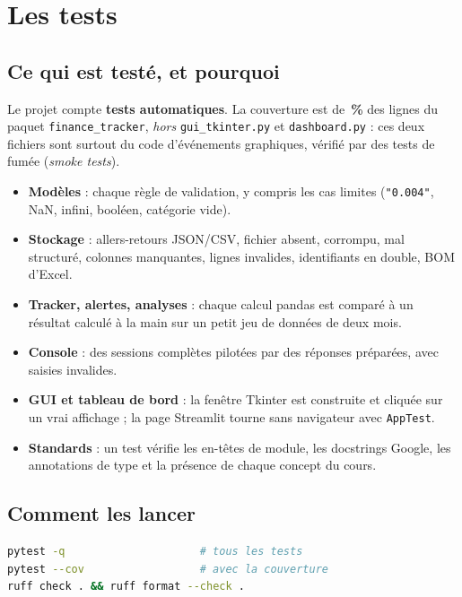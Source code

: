 \documentclass[11pt,a4paper]{article}
\newcommand{\code}[1]{{\NoAutoSpacing\texttt{#1}}}
\begin{document}
\section{Les tests}

\subsection{Ce qui est testé, et pourquoi}
Le projet compte \textbf{\TestCount{} tests automatiques}. La couverture est de
\textbf{\CoveragePct\,\%} des lignes du paquet \code{finance\_tracker}, \emph{hors}
\code{gui\_tkinter.py} et \code{dashboard.py} : ces deux fichiers sont surtout du code
d'événements graphiques, vérifié par des tests de fumée (\emph{smoke tests}).
\begin{itemize}
  \item \textbf{Modèles} : chaque règle de validation, y compris les cas limites (\code{"0.004"},
        NaN, infini, booléen, catégorie vide).
  \item \textbf{Stockage} : allers-retours JSON/CSV, fichier absent, corrompu, mal structuré,
        colonnes manquantes, lignes invalides, identifiants en double, BOM d'Excel.
  \item \textbf{Tracker, alertes, analyses} : chaque calcul pandas est comparé à un résultat
        calculé à la main sur un petit jeu de données de deux mois.
  \item \textbf{Console} : des sessions complètes pilotées par des réponses préparées, avec
        saisies invalides.
  \item \textbf{GUI et tableau de bord} : la fenêtre Tkinter est construite et cliquée sur un
        vrai affichage ; la page Streamlit tourne sans navigateur avec \code{AppTest}.
  \item \textbf{Standards} : un test vérifie les en-têtes de module, les docstrings Google, les
        annotations de type et la présence de chaque concept du cours.
\end{itemize}


\subsection{Comment les lancer}
\begin{lstlisting}[language=bash, caption={Lancer les tests et les contrôles de style}]
pytest -q                     # tous les tests
pytest --cov                  # avec la couverture
ruff check . && ruff format --check .
\end{lstlisting}
\end{document}
